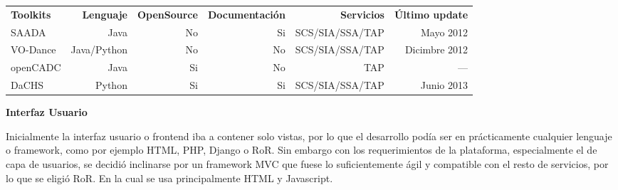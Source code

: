 \begin{table*}[h!t]
\centering
\begin{tabular}{lrrrrr}
    {\bf Toolkits} & {\bf Lenguaje} & {\bf OpenSource} & {\bf Documentación} & {\bf Servicios} & {\bf Último update}  \\
    SAADA          & Java           & No               & Si                  & SCS/SIA/SSA/TAP & Mayo 2012     \\
    VO-Dance       & Java/Python    & No               & No                  & SCS/SIA/SSA/TAP & Dicimbre 2012 \\
    openCADC       & Java           & Si               & No                  & TAP             & ---           \\
    DaCHS          & Python         & Si               & Si                  & SCS/SIA/SSA/TAP & Junio 2013    \\
\end{tabular}
\caption{Resumen de los toolkits en tabla comparativa}
\label{table:toolkits}
\end{table*}

\textbf{Interfaz Usuario}

Inicialmente la interfaz usuario o frontend iba a contener solo vistas, por lo que
el desarrollo podía ser en prácticamente cualquier lenguaje o framework, como por
ejemplo HTML, PHP, Django o RoR. Sin embargo con los requerimientos de la
plataforma, especialmente el de capa de usuarios, se decidió inclinarse por un
framework MVC que fuese lo suficientemente ágil y compatible con el resto de
servicios, por lo que se eligió RoR. En la cual se usa principalmente HTML y
Javascript.
